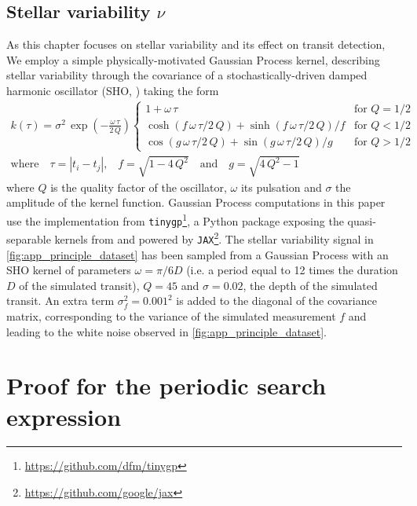\documentclass[modern]{aastex631}
\begin{document}
\subsection{Stellar variability $\nu$}\label{app_gp}
As this chapter focuses on stellar variability and its effect on transit detection, We employ a simple physically-motivated Gaussian Process kernel, describing stellar variability through the covariance of a stochastically-driven damped harmonic oscillator (SHO, \citealt{celerite, celerite2}) taking the form 
\begin{equation}
    \begin{gathered}
        k(\tau) = \sigma^2\,\exp\left(-\frac{\omega\,\tau}{2\,Q}\right)
        \left\{\begin{array}{ll}
            1 + \omega\,\tau & \mbox{for } Q = 1/2 \\
            \cosh(f\,\omega\,\tau/2\,Q) + \sinh(f\,\omega\,\tau/2\,Q)/f
                & \mbox{for } Q < 1/2 \\
            \cos(g\,\omega\,\tau/2\,Q) + \sin(g\,\omega\,\tau/2\,Q)/g
                & \mbox{for } Q > 1/2
        \end{array}\right. \\
        \text{where}\quad \tau = |t_i - t_j|\text{,}\quad f = \sqrt{1 - 4\,Q^2} \quad \text{and}\quad g = \sqrt{4\,Q^2 - 1}
    \end{gathered}
\end{equation}
where $Q$ is the quality factor of the oscillator, $\omega$ its pulsation and $\sigma$ the amplitude of the kernel function. Gaussian Process computations in this paper use the implementation from \texttt{tinygp}\footnote{\href{https://github.com/dfm/tinygp}{https://github.com/dfm/tinygp}}, a Python package exposing the quasi-separable kernels from \cite{celerite2} and powered by \texttt{JAX}\footnote{\href{https://github.com/google/jax}{https://github.com/google/jax}}. The stellar variability signal in \autoref{fig:app_principle_dataset} has been sampled from a Gaussian Process with an SHO kernel of parameters $\omega = \pi/6D$ (i.e. a period equal to 12 times the duration $D$ of the simulated transit), $Q=45$ and $\sigma=0.02$, the depth of the simulated transit. An extra term $\sigma_f^2=0.001^2$ is added to the diagonal of the covariance matrix, corresponding to the variance of the simulated measurement $f$ and leading to the white noise observed in \autoref{fig:app_principle_dataset}.

\section{Proof for the periodic search expression}\label{proof}
\end{document}
